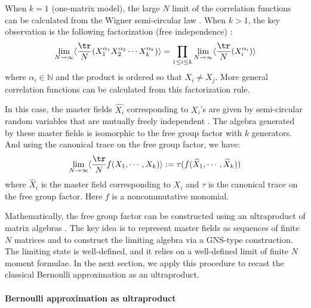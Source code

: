 \documentclass[a4paper,11pt]{article}
\theoremstyle{definition}
\numberwithin{equation}{section}
\begin{document}
When $k = 1$ (one-matrix model), the large $N$ limit of the correlation functions can be calculated from the Wigner semi-circular law \cite{mehta2004random}. When $k > 1$, the key observation is the following factorization (free independence) \cite{voiculescu1}:
\begin{equation}
    \lim_{N\rightarrow\infty}\langle\frac{\tr}{N}(X_1^{\alpha_1} X_2^{\alpha_2}\cdots X_k^{\alpha_k})\rangle = \prod_{1\leq i\leq k}\lim_{N\rightarrow \infty}\langle\frac{\tr}{N}(X_i^{\alpha_i})\rangle
\end{equation}
where $\alpha_i \in \mathbb{N}$ and the product is ordered so that $X_i\neq X_j$. More general correlation functions can be calculated from this factorization rule. 

In this case, the master fields $\widehat{X_i}$ corresponding to $X_i$'s are given by semi-circular random variables that are mutually freely independent \cite{voiculescu1}. The algebra generated by these master fields is isomorphic to the free group factor with $k$ generators. And using the canonical trace on the free group factor, we have:
\begin{equation}
    \lim_{N\rightarrow\infty}\langle\frac{\tr}{N}f(X_1,\cdots,X_k)\rangle := \tau(f(\widehat{X}_1,\cdots,\widehat{X}_k))
\end{equation}
where $\widehat{X}_i$ is the master field corresponding to $X_i$ and $\tau$ is the canonical trace on the free group factor. Here $f$ is a noncommutative monomial.

Mathematically, the free group factor can be constructed using an ultraproduct of matrix algebras \cite{Speicher1992, Speicher:1993kt}. The key idea is to represent master fields as sequences of finite $N$ matrices and to construct the limiting algebra via a GNS-type construction. The limiting state is well-defined, and it relies on a well-defined limit of finite $N$ moment formulae. In the next section, we apply this procedure to recast the classical Bernoulli approximation as an ultraproduct.

\paragraph{Bernoulli approximation as ultraproduct}
\end{document}
